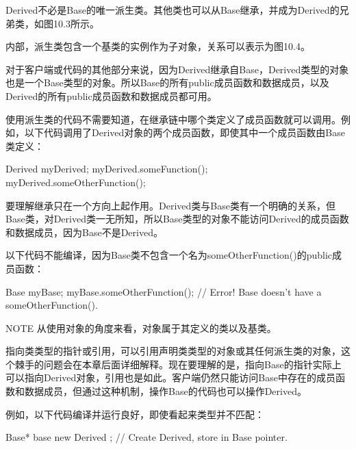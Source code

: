 

Derived不必是Base的唯一派生类。其他类也可以从Base继承，并成为Derived的兄弟类，如图10.3所示。


内部，派生类包含一个基类的实例作为子对象，关系可以表示为图10.4。



对于客户端或代码的其他部分来说，因为Derived继承自Base，Derived类型的对象也是一个Base类型的对象。所以Base的所有public成员函数和数据成员，以及Derived的所有public成员函数和数据成员都可用。

使用派生类的代码不需要知道，在继承链中哪个类定义了成员函数就可以调用。例如，以下代码调用了Derived对象的两个成员函数，即使其中一个成员函数由Base类定义：

\begin{cpp}
Derived myDerived;
myDerived.someFunction();
myDerived.someOtherFunction();
\end{cpp}

要理解继承只在一个方向上起作用。Derived类与Base类有一个明确的关系，但Base类，对Derived类一无所知，所以Base类型的对象不能访问Derived的成员函数和数据成员，因为Base不是Derived。

以下代码不能编译，因为Base类不包含一个名为someOtherFunction()的public成员函数：

\begin{cpp}
Base myBase;
myBase.someOtherFunction(); // Error! Base doesn't have a someOtherFunction().
\end{cpp}

\begin{myNotic}{NOTE}
从使用对象的角度来看，对象属于其定义的类以及基类。
\end{myNotic}

指向类类型的指针或引用，可以引用声明类类型的对象或其任何派生类的对象，这个棘手的问题会在本章后面详细解释。现在要理解的是，指向Base的指针实际上可以指向Derived对象，引用也是如此。客户端仍然只能访问Base中存在的成员函数和数据成员，但通过这种机制，操作Base的代码也可以操作Derived。

例如，以下代码编译并运行良好，即使看起来类型并不匹配：

\begin{cpp}
Base* base { new Derived {} }; // Create Derived, store in Base pointer.
\end{cpp}

